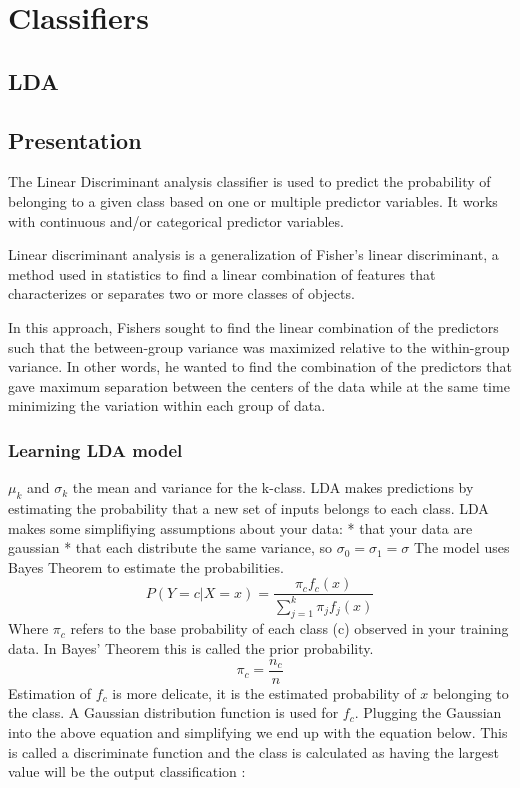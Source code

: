 \documentclass[
]{report}
\begin{document}
\hypertarget{classifiers}{%
\chapter{Classifiers}\label{classifiers}}

\hypertarget{lda}{%
\section{LDA}\label{lda}}

\hypertarget{presentation}{%
\section{Presentation}\label{presentation}}

The Linear Discriminant analysis classifier is used to predict the probability of belonging to a given class based on one or multiple predictor variables. It works with continuous and/or categorical predictor variables.

Linear discriminant analysis is a generalization of Fisher's linear discriminant, a method used in statistics to find a linear combination of features that characterizes or separates two or more classes of objects.

In this approach, Fishers sought to ﬁnd the linear combination of the predictors such that the between-group variance was maximized relative to the within-group variance. In other words, he wanted to ﬁnd the combination of the predictors that gave maximum separation between the centers of the data while at the same time minimizing the variation within each group of data. \citep{lda}

\hypertarget{learning-lda-model}{%
\subsection{Learning LDA model}\label{learning-lda-model}}

\(\mu_k\) and \(\sigma_k\) the mean and variance for the k-class.
LDA makes predictions by estimating the probability that a new set of inputs belongs to each class.
LDA makes some simplifiying assumptions about your data:
* that your data are gaussian
* that each distribute the same variance, so \(\sigma_0 = \sigma_1 = \sigma\)
The model uses Bayes Theorem to estimate the probabilities.
\[P(Y=c|X=x) = \frac{\pi_c f_c(x)}{\sum_{j=1}^k \pi_j f_j(x)}\]
Where \(\pi_c\) refers to the base probability of each class (c) observed in your training data. In Bayes' Theorem this is called the prior probability.
\[\pi_c=\frac{n_c}{n}\]
Estimation of \(f_c\) is more delicate, it is the estimated probability of \(x\) belonging to the class. A Gaussian distribution function is used for \(f_c\). Plugging the Gaussian into the above equation and simplifying we end up with the equation below. This is called a discriminate function and the class is calculated as having the largest value will be the output classification :
\end{document}
